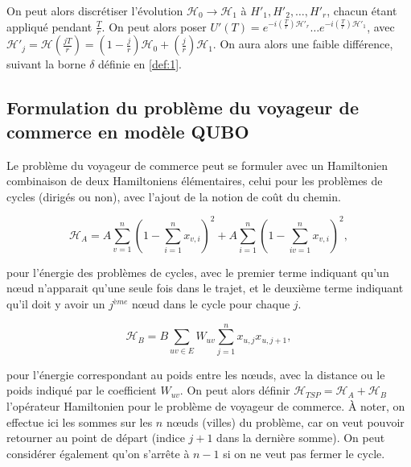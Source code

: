 \documentclass[12pt,a4paper]{article}
\begin{document}
On peut alors discrétiser l'évolution $\mathcal{H}_0 \to \mathcal{H}_1$ à $H'_1, H'_2, \dots, H'_r$, chacun étant appliqué pendant $\frac{T}{r}$. On peut alors poser $U'(T) = e^{-i (\frac{T}{r}) \mathcal{H}'_r} \dots e^{-i (\frac{T}{r}) \mathcal{H}'_1}$, avec $\mathcal{H}'_j = \mathcal{H}(\frac{jT}{r}) = (1 - \frac{j}{r}) \mathcal{H}_0 + (\frac{j}{r}) \mathcal{H}_1$. On aura alors une faible différence, suivant la borne $\delta$ définie en \ref{def:1}.


\subsection*{Formulation du problème du voyageur de commerce en modèle QUBO}

Le problème du voyageur de commerce peut se formuler avec un Hamiltonien combinaison de deux Hamiltoniens élémentaires, celui pour les problèmes de cycles (dirigés ou non), avec l'ajout de la notion de coût du chemin.

\begin{equation}
    \mathcal{H}_A = A \displaystyle \sum_{v=1}^{n} (1 - \displaystyle \sum_{i=1}^{n} x_ {v,i})^2 + A \displaystyle \sum_{i=1}^{n} (1 - \displaystyle \sum_{iv=1}^{n} x_ {v,i})^2,
\end{equation}

pour l'énergie des problèmes de cycles, avec le premier terme indiquant qu'un n\oe ud n'apparait qu'une seule fois dans le trajet, et le deuxième terme indiquant qu'il doit y avoir un $j^{ème}$ n\oe ud dans le cycle pour chaque $j$.

\begin{equation}
    \mathcal{H}_B = B \displaystyle \sum_{uv \in E} W_{uv} \displaystyle \sum_{j=1}^{n} x_{u,j}x_{u,j+1},
\end{equation}

pour l'énergie correspondant au poids entre les n\oe uds, avec la distance ou le poids indiqué par le coefficient $W_{uv}$. On peut alors définir $\mathcal{H}_{TSP} = \mathcal{H}_A + \mathcal{H}_B$ l'opérateur Hamiltonien pour le problème de voyageur de commerce. \`A noter, on effectue ici les sommes sur les $n$ n\oe uds (villes) du problème, car on veut pouvoir retourner au point de départ (indice $j+1$ dans la dernière somme). On peut considérer également qu'on s'arrête à $n-1$ si on ne veut pas fermer le cycle.
\end{document}
